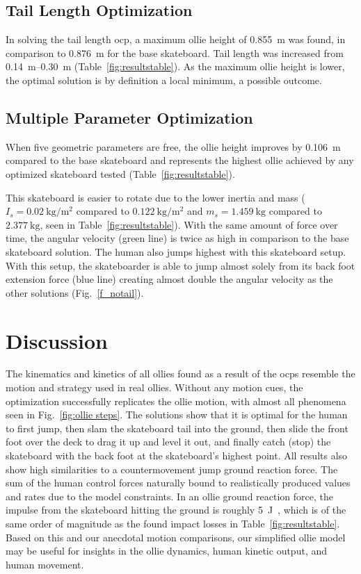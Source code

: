 \documentclass[default,iicol,pdflatex]{sn-jnl}
\begin{document}
\subsection{Tail Length Optimization}
In solving the tail length \gls{ocp}, a maximum ollie height of \SI{0.855}{\meter} was found, in comparison to \SI{0.876}{\meter} for the base skateboard. Tail length was increased from \SIrange{0.14}{0.30}{\meter} (Table~\ref{fig:resultstable}). As the maximum ollie height is lower, the optimal solution is by definition a local minimum, a possible outcome.

\subsection{Multiple Parameter Optimization}
When five geometric parameters are free, the ollie height improves by \SI{0.106}{\meter} compared to the base skateboard and represents the highest ollie achieved by any optimized skateboard tested (Table~\ref{fig:resultstable}). 

This skateboard is easier to rotate due to the lower inertia and mass ($I_s = \SI{0.02}{\kilo\gram\per\meter\squared}$ compared to $\SI{0.122}{\kilo\gram\per\meter\squared}$ and $m_s = \SI{1.459}{\kilo\gram}$ compared to $\SI{2.377}{\kilo\gram}$, seen in Table~\ref{fig:resultstable}).
With the same amount of force over time, the angular velocity (green line) is twice as high in comparison to the base skateboard solution.
The human also jumps highest with this skateboard setup.
With this setup, the skateboarder is able to jump almost solely from its back foot extension force (blue line) creating almost double the angular velocity as the other solutions (Fig.~\ref{f_notail}).

\section{Discussion}
The kinematics and kinetics of all ollies found as a result of the \glspl{ocp} resemble the motion and strategy used in real ollies.
Without any motion cues, the optimization successfully replicates the ollie motion, with almost all phenomena seen in Fig.~\ref{fig:ollie steps}.
The solutions show that it is optimal for the human to first jump, then slam the skateboard tail into the ground, then slide the front foot over the deck to drag it up and level it out, and finally catch (stop) the skateboard with the back foot at the skateboard's highest point.
All results also show high similarities to a countermovement jump ground reaction force.
The sum of the human control forces naturally bound to realistically produced values and rates due to the model constraints.
In an ollie ground reaction force, the impulse from the skateboard hitting the ground is roughly \SI{5}{\joule}~\cite{determan_kinetics_2006}, which is of the same order of magnitude as the found impact losses in Table~\ref{fig:resultstable}.
Based on this and our anecdotal motion comparisons, our simplified ollie model may be useful for insights in the ollie dynamics, human kinetic output, and human movement.
\end{document}

